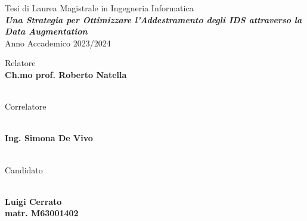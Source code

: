 \begin{titlepage}
\thispagestyle{empty}
\raggedright %


\vfill

{\large Tesi di Laurea Magistrale in Ingegneria Informatica}
\\[1cm]
{\textbf{\textit{\LARGE Una Strategia per Ottimizzare l'Addestramento degli IDS attraverso la Data Augmentation}}}
\\[1cm]
{\large Anno Accademico 2023/2024}

\vfill


\begin{table}[h]
Relatore
\\
\textbf{Ch.mo prof. Roberto Natella}
\\ \\
{\raggedright Correlatore}
\\
\textbf{Ing. Simona De Vivo}
\\ \\
{\raggedright Candidato}
\\
\textbf{Luigi Cerrato}
\\
\textbf{matr. M63001402}
\end{table}

\end{titlepage}
